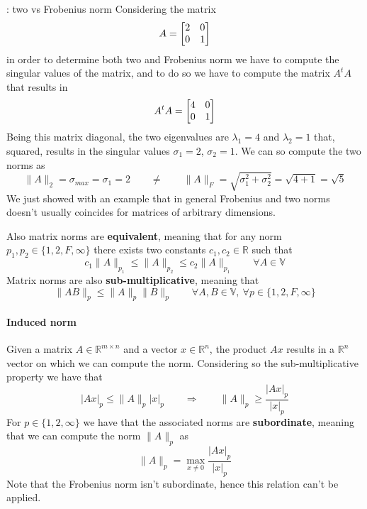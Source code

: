 	\begin{example}{: two vs Frobenius norm}
		Considering the matrix
		\[ A = \begin{bmatrix}  2 & 0 \\ 0 & 1 \end{bmatrix} \] 
		in order to determine both two and Frobenius norm we have to compute the singular values of the matrix, and to do so we have to compute the matrix $A^tA$ that results in
		\[ A^tA = \begin{bmatrix} 4 & 0 \\ 0 & 1 \end{bmatrix} \]
		Being this matrix diagonal, the two eigenvalues are $\lambda_1 = 4$ and $\lambda_2 = 1$ that, squared, results in the singular values $\sigma_1 = 2$, $\sigma_2 = 1$. We can so compute the two norms as
		\[ \| A\|_2 = \sigma_{max} = \sigma_1 = 2 \qquad \neq \qquad \|A\|_F = \sqrt{\sigma_1^2 + \sigma_2^2} = \sqrt{4 + 1} = \sqrt 5 \]
		We just showed with an example that in general Frobenius and two norms doesn't usually coincides for matrices of arbitrary dimensions.
	\end{example}
		
	Also matrix norms are \textbf{equivalent}, meaning that for any norm $p_1,p_2 \in \{ 1,2,F,\infty\}$ there exists two constants $c_1,c_2\in \mathds R$ such that
	\[ c_1 \|A\|_{p_1} \leq \|A\|_{p_2} \leq c_2 \|A\|_{p_1} \qquad \forall A \in \mathds V \]
	Matrix norms are also \textbf{sub-multiplicative}, meaning that
	\[ \|A B\|_p \leq \|A\|_p \|B\|_p \qquad \forall A,B\in \mathds V,\ \forall p \in \{1,2,F,\infty\} \]
	
	\paragraph{Induced norm} Given a matrix $A \in \mathds R^{m\times n}$ and a vector $x \in \mathds R^{n}$, the product $A x$ results in a $\mathds R^n$ vector on which we can compute the norm. Considering so the sub-multiplicative property we have that
	\[ | A x|_p \leq \|A\|_p |x|_p \qquad \Rightarrow \qquad \|A\|_p \geq \frac{|A x|_p}{|x|_p} \]
	For $p\in \{ 1,2,\infty\}$ we have that the associated norms are \textbf{subordinate}, meaning that we can compute the norm $\|A\|_p$ as
	\begin{equation}
		\|A\|_p = \max_{x\neq0} \frac{|Ax|_p}{|x|_p}
	\end{equation}
	Note that the Frobenius norm isn't subordinate, hence this relation can't be applied.
	
